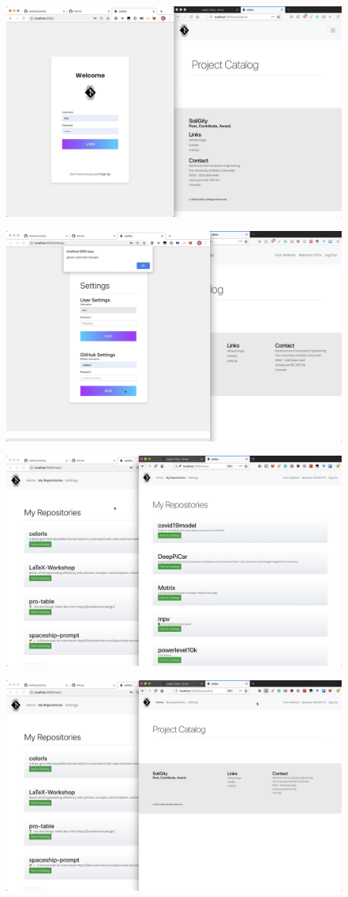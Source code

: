 \documentclass[12pt]{article}
\renewcommand{\_}{\kern-1.5pt\textunderscore\kern-1.5pt}
\begin{document}
\begin{enumerate}
	      \includegraphics[height=7cm]{graphs/19. bob_login}

	      \includegraphics[height=7cm]{graphs/20. bob_gitub_setup}

	      \includegraphics[height=7cm]{graphs/21. alice_bob_repos}

	      \includegraphics[height=7cm]{graphs/22. empty_project_catalog}


\end{enumerate}
\end{document}
